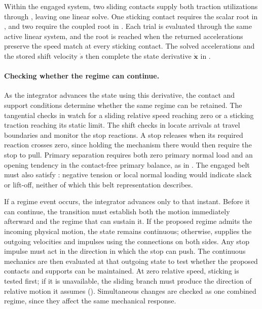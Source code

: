 \documentclass[11pt]{report}
\numberwithin{equation}{section}
\newcommand{\vect}[1]{\bm{#1}}
\begin{document}
Within the engaged system, two sliding contacts supply both traction
utilizations through , leaving one
linear solve. One sticking contact requires the scalar root in
, and two require the coupled root
in . Each trial is evaluated through the
same active linear system, and the root is reached when the returned
accelerations preserve the speed match at every sticking contact. The solved
accelerations and the stored shift velocity \(\dot s\) then complete the
state derivative \(\dot{\vect{x}}\) in .

\paragraph{Checking whether the regime can continue.}
As the integrator advances the state using this derivative, the contact and
support conditions determine whether the same regime can be retained. The
tangential checks in  watch for
a sliding relative speed reaching zero or a sticking traction reaching its
static limit. The shift checks in  locate
arrivals at travel boundaries and monitor the stop reactions. A stop releases
when its required reaction crosses zero, since holding the mechanism there
would then require the stop to pull. Primary separation requires both zero
primary normal load and an opening tendency in the contact-free primary
balance, as in . The engaged belt
must also satisfy : negative tension or
local normal loading would indicate slack or lift-off, neither of which
this belt representation describes.

If a regime event occurs, the integrator advances only to that instant.
Before it can continue, the transition must establish both the motion
immediately afterward and the regime that can sustain it. If the proposed
regime admits the incoming physical motion, the state remains continuous;
otherwise,  supplies the outgoing velocities
and impulses using the connections on both sides. Any stop impulse must act
in the direction in which the stop can push. The continuous mechanics are
then evaluated at that outgoing state to test whether the proposed contacts
and supports can be maintained. At zero relative speed, sticking is tested
first; if it is unavailable, the sliding branch must produce the direction
of relative motion it assumes
(). Simultaneous changes are checked
as one combined regime, since they affect the same mechanical response.
\end{document}
